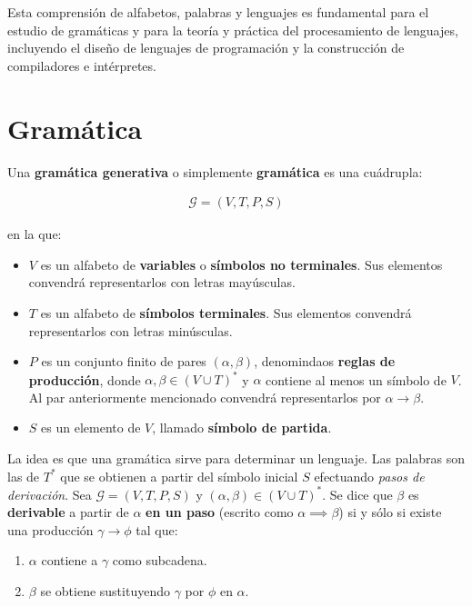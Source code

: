 Esta comprensión de alfabetos, palabras y lenguajes es fundamental para el estudio de gramáticas y para la teoría y práctica del procesamiento de lenguajes, incluyendo el diseño de lenguajes de programación y la construcción de compiladores e intérpretes.

\section{Gramática}\label{section:gramatica}
\noindent
Una \textbf{gramática generativa} o simplemente \textbf{gramática} es una cuádrupla:

\begin{align*}
    \mathcal{G} = (V,T,P,S)
\end{align*}

\noindent
en la que:

\begin{itemize}
    \item $V$ es un alfabeto de \textbf{variables} o \textbf{símbolos no terminales}. Sus elementos convendrá representarlos con letras mayúsculas.
    \item $T$ es un alfabeto de \textbf{símbolos terminales}. Sus elementos convendrá representarlos con letras minúsculas.
    \item $P$ es un conjunto finito de pares $(\alpha,\beta)$, denomindaos \textbf{reglas de producción}, donde $\alpha,\beta \in (V \cup T)^*$ y $\alpha$ contiene al menos un símbolo de $V$. Al par anteriormente mencionado convendrá representarlos por $\alpha \rightarrow \beta$.
    \item $S$ es un elemento de $V$, llamado \textbf{símbolo de partida}.
\end{itemize}

La idea es que una gramática sirve para determinar un lenguaje. Las palabras son las de $T^*$ que se obtienen a partir del símbolo inicial $S$ efectuando \textit{pasos de derivación}. Sea $\mathcal{G} = (V,T,P,S)$ y $(\alpha,\beta)\in (V \cup T)^*$. Se dice que $\beta$ es \textbf{derivable} a partir de $\alpha$ \textbf{en un paso} (escrito como $\alpha \implies \beta$) si y sólo si existe una producción $\gamma \rightarrow \phi$ tal que:

\begin{enumerate}
    \item $\alpha$ contiene a $\gamma$ como subcadena.
    \item $\beta$ se obtiene sustituyendo $\gamma$ por $\phi$ en $\alpha$.
\end{enumerate}

